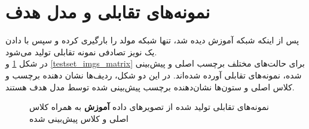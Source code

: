 \section{نمونه‌های تقابلی و مدل هدف}
پس از اینکه شبکه 
آموزش دیده شد، تنها شبکه مولد را بارگیری کرده و سپس با دادن یک نویز تصادفی نمونه‌ تقابلی تولید می‌شود.
\\
در شکل 
\ref{trainset_imgs_matrix} 
و 
\ref{testset_imgs_matrix} 
برای حالت‌های مختلف برچسب اصلی و پیش‌بینی شده، نمونه‌های تقابلی آورده شده‌اند. در این دو شکل، ردیف‌ها نشان دهنده برچسب و کلاس اصلی و ستون‌ها نشان‌دهنده برچسب پیش‌بینی شده توسط مدل هدف هستند.
\begin{figure}[H]
	\caption{نمونه‌های تقابلی تولید شده از تصویر‌های داده 
		\textbf{آموزش}
		 به همراه کلاس اصلی و کلاس پیش‌بینی شده}
	\label{trainset_imgs_matrix}
\end{figure}

